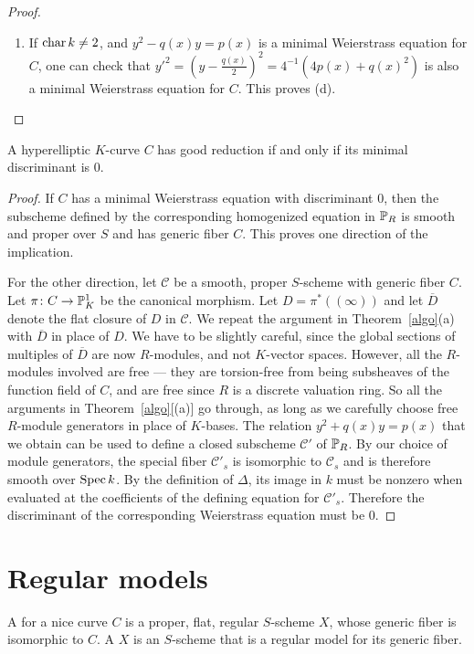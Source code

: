 \begin{proof}
\begin{enumerate}
 \item 
 If $\cha k \neq 2$, and $y^2-q(x)y=p(x)$ is a minimal Weierstrass equation for $C$, one can check that $y'^2 = (y - \tfrac{q(x)}{2})^2 = 4^{-1}(4p(x)+q(x)^2)$ is also a minimal Weierstrass equation for $C$. This proves (d). \qedhere
\end{enumerate}
 \end{proof}

\begin{prop}\label{goodreddisccrit}
 A hyperelliptic $K$-curve $C$ has good reduction if and only if its minimal discriminant is $0$. 
\end{prop}
\begin{proof}
 If $C$ has a minimal Weierstrass equation with discriminant $0$, then the subscheme defined by the corresponding homogenized equation in $\P_R$ is smooth and proper over $S$ and has generic fiber $C$. This proves one direction of the implication.
 
 For the other direction, let $\mathcal{C}$ be a smooth, proper $S$-scheme with generic fiber $C$. Let $\pi \colon C \rightarrow \P^1_K$ be the canonical morphism. Let $D = \pi^*((\infty))$ and let $\overline{D}$ denote the flat closure of $D$ in $\mathcal{C}$. We repeat the argument in Theorem~\ref{algo}(a) with $\overline{D}$ in place of $D$. We have to be slightly careful, since the global sections of multiples of $\overline{D}$ are now $R$-modules, and not $K$-vector spaces. However, all the $R$-modules involved are free --- they are torsion-free from being subsheaves of the function field of $C$, and are free since $R$ is a discrete valuation ring. So all the arguments in Theorem~\ref{algo}[(a)] go through, as long as we carefully choose free $R$-module generators in place of $K$-bases. The relation $y^2+q(x)y=p(x)$ that we obtain can be used to define a closed subscheme $\mathcal{C}'$ of $\P_R$. By our choice of module generators, the special fiber $\mathcal{C}'_s$ is isomorphic to $\mathcal{C}_s$ and is therefore smooth over $\Spec k$. By the definition of $\Delta$, its image in $k$ must be nonzero when evaluated at the coefficients of the defining equation for $\mathcal{C}'_s$. Therefore the discriminant of the corresponding Weierstrass equation must be $0$.
\end{proof}

\section{Regular models}
\begin{defin}
A {} for a nice curve $C$ is a proper, flat, regular $S$-scheme $X$, whose generic fiber  is isomorphic to $C$. A {} $X$ is an $S$-scheme that is a regular model for its generic fiber.  
\end{defin}

